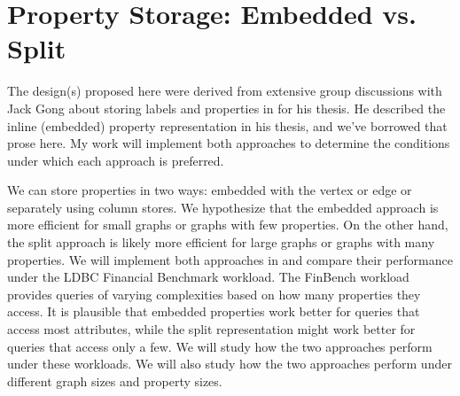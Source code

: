 \section{Property Storage: Embedded vs. Split}
\begin{highlight}
The design(s) proposed here were derived from extensive group discussions with Jack Gong about storing labels and properties in \project{} for his thesis. 
He described the inline (embedded) property representation in his thesis, and we've borrowed that prose here.
My work will implement both approaches to determine the conditions under which each approach is preferred.
\end{highlight}

We can store properties in two ways: embedded with the vertex or edge or separately using column stores.
We hypothesize that the embedded approach is more efficient for small graphs or graphs with few properties.
On the other hand, the split approach is likely more efficient for large graphs or graphs with many properties.
We will implement both approaches in \project{} and compare their performance under the LDBC Financial Benchmark workload.
The FinBench workload provides queries of varying complexities based on how many properties they access.
It is plausible that embedded properties work better for queries that access most attributes, while the split representation might work better for queries that access only a few.
We will study how the two approaches perform under these workloads.
We will also study how the two approaches perform under different graph sizes and property sizes.

